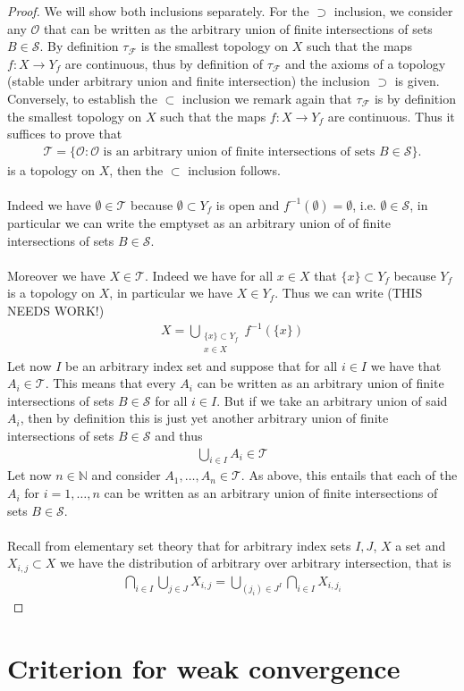 \documentclass[12pt,a4paper]{article}
\begin{document}
\begin{proof}
We will show both inclusions separately. For the $\supset$ inclusion, we consider any $\mathcal{O}$ that can be written as the arbitrary union of finite intersections of sets $B \in \mathcal{S}$. By definition $\tau_\mathcal{F}$ is the smallest topology on $X$ such that the maps $f: X \to Y_f$ are continuous, thus by definition of $\tau_\mathcal{F}$ and the axioms of a topology (stable under arbitrary union and finite intersection) the inclusion $\supset$ is given. 
\newpage
Conversely, to establish the $\subset$ inclusion we remark again  that $\tau_\mathcal{F}$ is by definition the smallest topology on $X$ such that the maps $f:X \to Y_f$ are continuous. Thus it suffices to prove that 
\begin{align*}
\mathcal{T}=\lbrace \mathcal{O}: \mathcal{O} \text{ is an arbitrary union of finite intersections of sets } B \in \mathcal{S} \rbrace. 
\end{align*} 
is a topology on $X$, then the $\subset$ inclusion follows. 
\\\\
Indeed we have $\emptyset \in \mathcal{T}$ because $\emptyset \subset Y_f$ is open and $f^{-1}(\emptyset)= \emptyset$, i.e. $\emptyset \in \mathcal{S}$, in particular we can write the emptyset as an arbitrary union of of finite intersections of sets $B \in \mathcal{S}$. 
\\\\
Moreover we have $X \in \mathcal{T}$. Indeed we have for all $x \in X$ that $\lbrace x \rbrace \subset Y_f$ because $Y_f$ is a topology on $X$, in particular we have $X \in Y_f$. Thus we can write (THIS NEEDS WORK!)
\begin{align*}
X= \bigcup_{\substack{\lbrace x \rbrace \subset Y_f \\ x \in X}} f^{-1}(\lbrace x \rbrace)
\end{align*}
Let now $I$ be an arbitrary index set and suppose that for all $i \in I$ we have that $A_i \in \mathcal{T}$. This means that every $A_i$ can be written as an arbitrary union of finite intersections of sets $B \in \mathcal{S}$ for all $i \in I$. But if we take an arbitrary union of said $A_i$, then  by definition this is just yet another arbitrary union of finite intersections of sets $B \in \mathcal{S}$ and thus
\begin{align*}
\bigcup_{i \in I} A_i \in \mathcal{T}
\end{align*}
Let now $n \in \mathbb{N}$ and consider $A_1, \dots , A_n \in \mathcal{T}$. As above, this entails that each of the $A_i$ for $i=1, \dots , n$ can be written as an arbitrary union of finite intersections of sets $B \in \mathcal{S}$. \\
\\
Recall from elementary set theory that for arbitrary index sets $I,J$, $X$ a set and $X_{i,j} \subset X$ we have the distribution of arbitrary over arbitrary intersection, that is
\begin{align*}
\bigcap_{i \in I} \bigcup_{j \in J} X_{i,j} = \bigcup_{(j_i) \in J^I}  \bigcap_{i \in I} X_{i,j_i}
\end{align*}
\end{proof}
\newpage
\section{Criterion for weak convergence}
\end{document}
